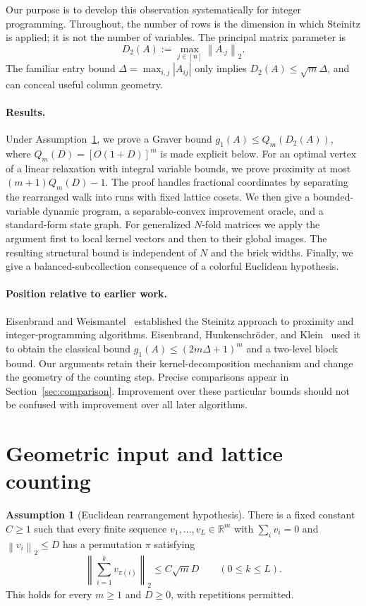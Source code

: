 \documentclass[11pt]{article}
\theoremstyle{definition}
\newtheorem{assumption}[theorem]{Assumption}
\theoremstyle{remark}
\newcommand{\R}{\mathbb R}
\newcommand{\norm}[1]{\left\lVert #1\right\rVert}
\begin{document}
Our purpose is to develop this observation systematically for integer
programming. Throughout, the number of rows is the dimension in which
Steinitz is applied; it is not the number of variables. The principal
matrix parameter is
\[
 D_2(A):=\max_{j\in[n]}\norm{A_{\cdot j}}_2.
\]
The familiar entry bound $\Delta=\max_{i,j}|A_{ij}|$ only implies
$D_2(A)\le\sqrt m\Delta$, and can conceal useful column geometry.

\paragraph{Results.}
Under Assumption~\ref{ass:ES}, we prove a Graver bound
$g_1(A)\le Q_m(D_2(A))$, where $Q_m(D)=[O(1+D)]^m$ is made explicit
below. For an optimal vertex of a linear relaxation with integral variable
bounds, we prove proximity at most $(m+1)Q_m(D)-1$. The proof handles
fractional coordinates by separating the rearranged walk into runs with
fixed lattice cosets. We then give a bounded-variable dynamic program, a
separable-convex improvement oracle, and a standard-form state graph.
For generalized $N$-fold matrices we apply the argument first to local
kernel vectors and then to their global images. The resulting structural
bound is independent of $N$ and the brick widths. Finally, we give a
balanced-subcollection consequence of a colorful Euclidean hypothesis.

\paragraph{Position relative to earlier work.}
Eisenbrand and Weismantel~\cite{EW} established the Steinitz approach to
proximity and integer-programming algorithms. Eisenbrand, Hunkenschr\"oder,
and Klein~\cite{EHK} used it to obtain the classical bound
$g_1(A)\le(2m\Delta+1)^m$ and a two-level block bound. Our arguments
retain their kernel-decomposition mechanism and change the geometry of
the counting step. Precise comparisons appear in Section~\ref{sec:comparison}.
Improvement over these particular bounds should not be confused with
improvement over all later algorithms.

\section{Geometric input and lattice counting}

\begin{assumption}[Euclidean rearrangement hypothesis]\label{ass:ES}
There is a fixed constant $C\ge1$ such that every finite sequence
$v_1,\ldots,v_L\in\R^m$ with $\sum_i v_i=0$ and
$\norm{v_i}_2\le D$ has a permutation $\pi$ satisfying
\[
 \norm{\sum_{i=1}^k v_{\pi(i)}}_2\le C\sqrt m D
 \qquad(0\le k\le L).
\]
This holds for every $m\ge1$ and $D\ge0$, with repetitions permitted.
\end{assumption}
\end{document}
